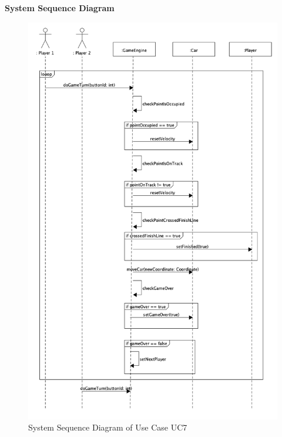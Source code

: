 			\textbf{System Sequence Diagram}
				\begin{figure}[H]
					\centering
					\includegraphics[width=14cm,keepaspectratio,center]{img/Use-Case-Model_UC7_System-Sequence-Diagram.png}
					\caption{System Sequence Diagram of Use Case UC7}
				\end{figure}

			

